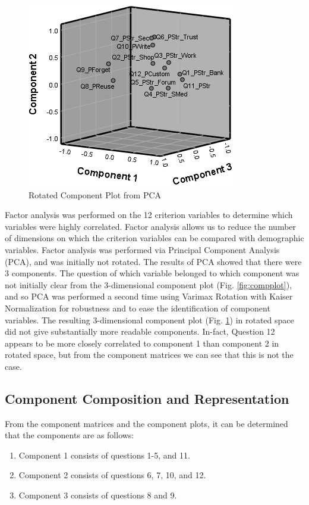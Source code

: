 \documentclass[letterpaper, 10 pt, conference]{ieeeconf}  %
\begin{document}
\begin{figure}[thpb]
  \centering
    \includegraphics[scale=0.84]{compplotrot.PNG}
  \caption{Rotated Component Plot from PCA}
  \label{fig:compplotrot}
\end{figure}

Factor analysis was performed on the 12 criterion variables to determine which variables were highly correlated. Factor analysis allows us to reduce the number of dimensions on which the criterion variables can be compared with demographic variables. Factor analysis was performed via Principal Component Analysis (PCA), and was initially not rotated. The results of PCA showed that there were 3 components. The question of which variable belonged to which component was not initially clear from the 3-dimensional component plot (Fig. \ref{fig:compplot}), and so PCA was performed a second time using Varimax Rotation with Kaiser Normalization for robustness and to ease the identification of component variables. The resulting 3-dimensional component plot (Fig. \ref{fig:compplotrot}) in rotated space did not give substantially more readable components. In-fact, Question 12 appears to be more closely correlated to component 1 than component 2 in rotated space, but from the component matrices we can see that this is not the case. 

\subsection{Component Composition and Representation}

From the component matrices and the component plots, it can be determined that the components are as follows:

\begin{enumerate}
\item 	Component 1 consists of questions 1-5, and 11.
\item 	Component 2 consists of questions 6, 7, 10, and 12.
\item 	Component 3 consists of questions 8 and 9.
\end{enumerate}
\end{document}
